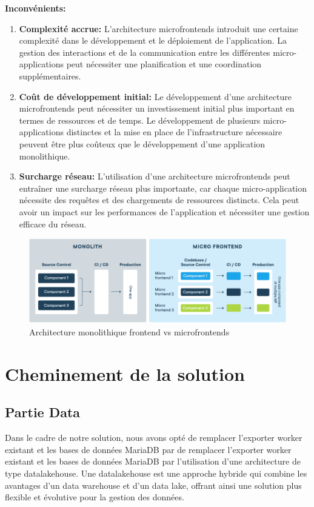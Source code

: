 \textbf{Inconvénients:}
\begin{enumerate}
    \item \textbf{Complexité accrue:} L'architecture microfrontends introduit une certaine complexité dans le développement et le déploiement de l'application. La gestion des interactions et de la communication entre les différentes micro-applications peut nécessiter une planification et une coordination supplémentaires.
    \item \textbf{Coût de développement initial:} Le développement d'une architecture microfrontends peut nécessiter un investissement initial plus important en termes de ressources et de temps. Le développement de plusieurs micro-applications distinctes et la mise en place de l'infrastructure nécessaire peuvent être plus coûteux que le développement d'une application monolithique.
    \item \textbf{Surcharge réseau:} L'utilisation d'une architecture microfrontends peut entraîner une surcharge réseau plus importante, car chaque micro-application nécessite des requêtes et des chargements de ressources distincts. Cela peut avoir un impact sur les performances de l'application et nécessiter une gestion efficace du réseau.
\end{enumerate}

\begin{figure}[H]
\centering
\includegraphics[width=\linewidth]{images/micro-frontend-vs-monolith-frontend.png}
\caption{Architecture monolithique frontend vs microfrontends}\label{fig:monolithfrontendvsmicrofrontends}
\end{figure}

\section{Cheminement de la solution}
\subsection{Partie Data}
Dans le cadre de notre solution, nous avons opté de remplacer l'exporter worker existant et les bases de données MariaDB par de remplacer l'exporter worker existant et les bases de données MariaDB par l'utilisation d'une architecture de type datalakehouse. Une datalakehouse est une approche hybride qui combine les avantages d'un data warehouse et d'un data lake, offrant ainsi une solution plus flexible et évolutive pour la gestion des données.

